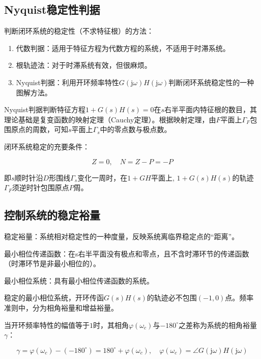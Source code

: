 \documentclass[cn, blue, normal, 12pt]{elegantnote}
\begin{document}
\subsection{Nyquist稳定性判据}

判断闭环系统的稳定性（不求特征根）的方法：

\begin{enumerate}
    \setlength{\itemsep}{6pt}
    \item 代数判据：适用于特征方程为代数方程的系统，不适用于时滞系统。
    \item 根轨迹法：对于时滞系统有效，但很麻烦。
    \item Nyquist判据：利用开环频率特性$G(\mathrm{j}\omega)H(\mathrm{j}\omega)$判断闭环系统稳定性的一种图解方法。
\end{enumerate}

Nyquist判据判断特征方程$1+G(s)H(s)=0$在$s$右半平面内特征根的数目，其理论基础是复变函数的映射定理（Cauchy定理）。根据映射定理，由$F$平面上$\varGamma_F$包围原点的周数，可知$s$平面上$\varGamma_s$中的零点数与极点数。

闭环系统稳定的充要条件：

\begin{equation}
    Z=0, \quad N=Z-P=-P
\end{equation}

即$s$顺时针沿$D$形围线$\varGamma_s$变化一周时，在$1+GH$平面上, $1+G(s)H(s)$的轨迹$\varGamma_F$须逆时针包围原点$P$周。

\subsection{控制系统的稳定裕量}

稳定裕量：系统相对稳定性的一种度量，反映系统离临界稳定点的“距离”。

最小相位传递函数：在s右半平面没有极点和零点，且不含时滞环节的传递函数（时滞环节是非最小相位的）。

最小相位系统：具有最小相位传递函数的系统。

稳定的最小相位系统，开环传函$G(s)H(s)$的轨迹必不包围$(-1,0)$点。频率准则中，分为相角裕量和增益裕量。

当开环频率特性的幅值等于$1$时，其相角$\varphi(\omega_c)$与$-180^{\circ}$之差称为系统的相角裕量$\gamma$：

\begin{equation}
    \gamma=\varphi(\omega_c)-(-180^{\circ})=180^{\circ}+\varphi(\omega_c), \quad \varphi(\omega_c)=\angle{G(\mathrm{j}\omega)H(\mathrm{j}\omega)}
\end{equation}
\end{document}
